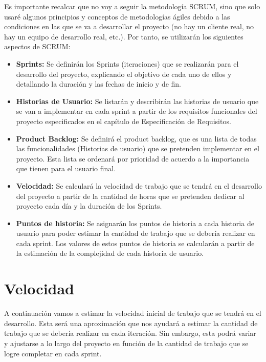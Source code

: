 Es importante recalcar que no voy a seguir la metodología SCRUM, sino que solo usaré algunos principios y
conceptos de metodologías ágiles debido a las condiciones en las que se va a desarrollar el proyecto
(no hay un cliente real, no hay un equipo de desarrollo real, etc.). Por tanto, se utilizarán los siguientes aspectos de SCRUM:
\begin{itemize}
    \item \textbf{Sprints:} Se definirán los Sprints (iteraciones) que se realizarán para el desarrollo del proyecto, explicando
          el objetivo de cada uno de ellos y detallando la duración y las fechas de inicio y de fin.
    \item \textbf{Historias de Usuario:} Se listarán y describirán las historias de usuario que se van a implementar en cada sprint a partir
          de los requisitos funcionales del proyecto especificados en el capítulo de Especificación de Requisitos.
    \item \textbf{Product Backlog: } Se definirá el product backlog, que es una lista de todas las funcionalidades (Historias de usuario) que se
          pretenden implementar en el proyecto. Esta lista se ordenará por prioridad de acuerdo a la importancia que tienen para el usuario final.
    \item \textbf{Velocidad:} Se calculará la velocidad de trabajo que se tendrá en el desarrollo del proyecto a partir de la cantidad de horas
          que se pretenden dedicar al proyecto cada día y la duración de los Sprints.
    \item \textbf{Puntos de historia: } Se asignarán los puntos de historia a cada historia de usuario para poder estimar la cantidad de trabajo
          que se debería realizar en cada sprint. Los valores de estos puntos de historia se calcularán a partir de la estimación de la complejidad de cada historia de usuario.
\end{itemize}



\section{Velocidad}
A continuación vamos a estimar la velocidad inicial de trabajo que se tendrá en el desarrollo. Esta será una aproximación
que nos ayudará a estimar la cantidad de trabajo que se debería realizar en cada iteración. Sin embargo, esta podrá variar
y ajustarse a lo largo del proyecto en función de la cantidad de trabajo que se logre completar en cada sprint.


